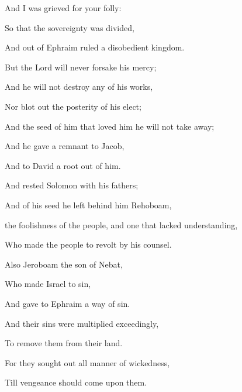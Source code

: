 {\par }{\Q And I was grieved for your folly:
\par }{\Q {}So that the sovereignty was divided,
\par }{\Q And out of Ephraim ruled a disobedient kingdom.
\par }{\Q {}But the Lord will never forsake his mercy;
\par }{\Q And he will not destroy any of his works,
\par }{\Q Nor blot out the posterity of his elect;
\par }{\Q And the seed of him that loved him he will not take away;
\par }{\Q And he gave a remnant to Jacob,
\par }{\Q And to David a root out of him.
\par }{\BB \par }{\Q {}And
{} rested Solomon with his fathers;
\par }{\Q And of his seed he left behind him Rehoboam,
\par }{ the foolishness of the people, and one that lacked understanding,
\par }{\Q Who made the people to revolt by his counsel.
\par }{\Q Also Jeroboam the son of Nebat,
\par }{\Q Who made Israel to sin,
\par }{\Q And gave to Ephraim a way of sin.
\par }{\Q {}And their sins were multiplied exceedingly,
\par }{\Q To remove them from their land.
\par }{\Q {}For they sought out all manner of wickedness,
\par }{\Q Till vengeance should come upon them.
\par }{\BB \par }
